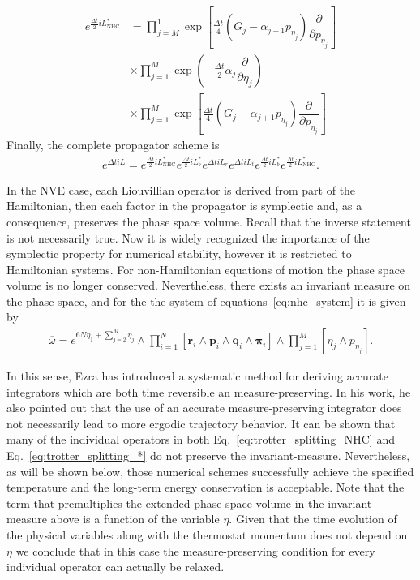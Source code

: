\documentclass[aip,jcp,reprint,amsmath,amssymb,raggedbottom]{revtex4-1}
\newcommand{\vt}[1]{\boldsymbol{\mathbf{#1}}}           %
\newcommand{\diff}[2]{\dfrac{\partial #1}{\partial #2}} %
\begin{document}
\begin{equation}
\begin{split}
e^{\frac{\Delta t}{2} i\!L_\text{NHC}^\ast } &= \prod_{j=M}^1 \exp\left[\frac{\Delta t}{4} \left( G_j - \alpha_{j+1} p_{\eta_j} \right) \diff{}{p_{\eta_j}}\right] \\
&\times \prod_{j=1}^M \exp\left(-\frac{\Delta t}{2} \alpha_j \diff{}{\eta_j}\right) \\
&\times \prod_{j=1}^M \exp\left[\frac{\Delta t}{4} \left( G_j - \alpha_{j+1} p_{\eta_j} \right) \diff{}{p_{\eta_j}}\right]
\end{split}
\end{equation}
Finally, the complete propagator scheme is
\begin{equation}
\label{eq:trotter_splitting_*}
\begin{split}
e^{\Delta t i\!L} = e^{\frac{\Delta t}{2} i\!L_\text{NHC}^\ast} e^{\frac{\Delta t}{2} i\!L_b^\ast} e^{\Delta t i\!L_r} e^{\Delta t i\!L_t}  e^{\frac{\Delta t}{2} i\!L_b^\ast} e^{\frac{\Delta t}{2} i\!L_\text{NHC}^\ast}.
\end{split}
\end{equation}

In the NVE case, each Liouvillian operator is derived from part of the Hamiltonian, then each factor in the propagator is symplectic and, as a consequence, preserves the phase space volume. Recall that the inverse statement is not necessarily true. Now it is widely recognized the importance of the symplectic property for numerical stability,\cite{Skeel1997} however it is restricted to Hamiltonian systems. For non-Hamiltonian equations of motion the phase space volume is no longer conserved. Nevertheless, there exists an invariant measure on the phase space, and for the the system of equations~\ref{eq:nhc_system} it is given by
\begin{align*}
\overline{\omega} = e^{6N \eta_1 + \sum_{j=2}^M \eta_j} \wedge \prod_{i=1}^{N}[\vt {r}_i \wedge\vt {p}_i\wedge \vt {q}_i\wedge \vt {\pi}_i ] \wedge \prod_{j=1}^{M}[ \eta_j\wedge p_{\eta_j} ].
\end{align*}

In this sense, Ezra \cite{Ezra2006} has introduced a systematic method for deriving accurate integrators which are both time  reversible an measure-preserving. In his work, he also pointed out that the use of an accurate measure-preserving integrator does not necessarily lead to more ergodic trajectory behavior. It can be shown that many of the individual operators in both Eq.~\ref{eq:trotter_splitting_NHC} and Eq.~\ref{eq:trotter_splitting_*} do not preserve the invariant-measure. Nevertheless, as will be shown below, those numerical schemes successfully achieve the specified temperature and the long-term energy conservation is acceptable. Note that the term that premultiplies the extended phase space volume in the invariant-measure above is a function of the variable $\eta$. Given that the time evolution of the physical variables along with the thermostat momentum does not depend on $\eta$ we conclude that in this case the measure-preserving condition for every individual operator can actually be relaxed.
\end{document}
